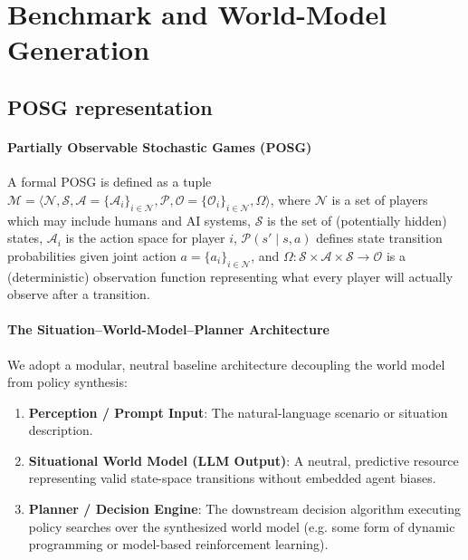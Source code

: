 \documentclass{article}
\begin{document}
\section{Benchmark and World-Model Generation}
\label{sec:method}

\subsection{POSG representation}
\label{subsec:preliminaries}

\paragraph{Partially Observable Stochastic Games (POSG)}
A formal POSG is defined as a tuple $\mathcal{M} = \langle \mathcal{N}, \mathcal{S}, \mathcal{A}=\{\mathcal{A}_i\}_{i \in \mathcal{N}}, \mathcal{P}, \mathcal{O}=\{\mathcal{O}_i\}_{i \in \mathcal{N}}, \Omega \rangle$, where $\mathcal{N}$ is a set of players which may include humans and AI systems,
$\mathcal{S}$ is the set of (potentially hidden) states, $\mathcal{A}_i$ is the action space for player $i$, $\mathcal{P}(s' \mid s, a)$ defines state transition probabilities given joint action $a=\{a_i\}_{i\in\mathcal N}$, and $\Omega:\mathcal S\times\mathcal A\times\mathcal S\to\mathcal O$ is a (deterministic) observation function representing what every player will actually observe after a transition.

\paragraph{The Situation--World-Model--Planner Architecture}
We adopt a modular, neutral baseline architecture decoupling the world model from policy synthesis:
\begin{enumerate}
    \item \textbf{Perception / Prompt Input}: The natural-language scenario or situation description.
    \item \textbf{Situational World Model (LLM Output)}: A neutral, predictive resource representing valid state-space transitions without embedded agent biases.
    \item \textbf{Planner / Decision Engine}: The downstream decision algorithm executing policy searches over the synthesized world model (e.g. some form of dynamic programming or model-based reinforcement learning).
\end{enumerate}
\end{document}
